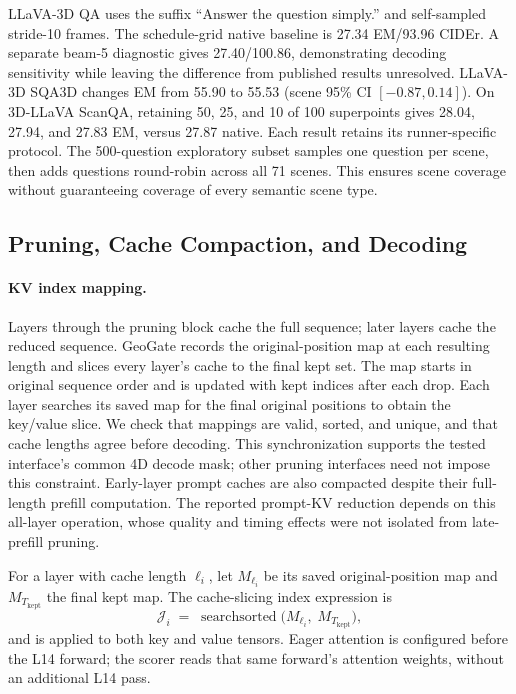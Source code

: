 LLaVA-3D QA uses the suffix ``Answer the question simply.'' and self-sampled stride-10 frames. The schedule-grid native baseline is 27.34 EM/93.96 CIDEr. A separate beam-5 diagnostic gives 27.40/100.86, demonstrating decoding sensitivity while leaving the difference from published results unresolved. LLaVA-3D SQA3D changes EM from 55.90 to 55.53 (scene 95\% CI $[-0.87,0.14]$). On 3D-LLaVA ScanQA, retaining 50, 25, and 10 of 100 superpoints gives 28.04, 27.94, and 27.83 EM, versus 27.87 native. Each result retains its runner-specific protocol. The 500-question exploratory subset samples one question per scene, then adds questions round-robin across all 71 scenes. This ensures scene coverage without guaranteeing coverage of every semantic scene type.

\subsection{Pruning, Cache Compaction, and Decoding}
\label{sec:supp_implementation}
\paragraph{KV index mapping.} Layers through the pruning block cache the full sequence; later layers cache the reduced sequence. GeoGate records the original-position map at each resulting length and slices every layer's cache to the final kept set. The map starts in original sequence order and is updated with kept indices after each drop. Each layer searches its saved map for the final original positions to obtain the key/value slice. We check that mappings are valid, sorted, and unique, and that cache lengths agree before decoding. This synchronization supports the tested interface's common 4D decode mask; other pruning interfaces need not impose this constraint. Early-layer prompt caches are also compacted despite their full-length prefill computation. The reported prompt-KV reduction depends on this all-layer operation, whose quality and timing effects were not isolated from late-prefill pruning.

For a layer with cache length $\ell_i$, let $M_{\ell_i}$ be its saved original-position map and $M_{T_{\text{kept}}}$ the final kept map. The cache-slicing index expression is
\begin{equation}
\mathcal{J}_i \;=\; \operatorname{searchsorted}\!\big(M_{\ell_i},\; M_{T_{\text{kept}}}\big),
\end{equation}
and is applied to both key and value tensors. Eager attention is configured before the L14 forward; the scorer reads that same forward's attention weights, without an additional L14 pass.

